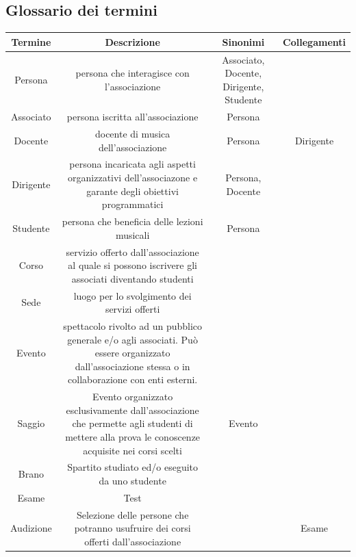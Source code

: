 \documentclass[12pt]{article}
\begin{document}
	\subsection{Glossario dei termini}
		\begin{tabular}{c|c|c|c}
			\hline
			Termine & Descrizione & Sinonimi & Collegamenti\\
			\hline
			Persona & persona che interagisce con l'associazione & Associato, Docente, Dirigente, Studente &\\
			\hline
			Associato & persona iscritta all'associazione & Persona & \\
			\hline
			Docente & docente di musica dell'associazione  & Persona & Dirigente\\
			\hline
			Dirigente & persona incaricata agli aspetti organizzativi dell'associazone e garante degli obiettivi programmatici & Persona, Docente & \\
			\hline
			Studente & persona che beneficia delle lezioni musicali & Persona & \\
			\hline
			Corso & servizio offerto dall'associazione al quale si possono iscrivere gli associati diventando studenti & &\\
			\hline
			Sede & luogo per lo svolgimento dei servizi offerti & &\\
			\hline
			Evento & spettacolo rivolto ad un pubblico generale e/o agli associati. Può essere organizzato dall'associazione stessa o in collaborazione con enti esterni. & &\\
			\hline
			Saggio & Evento organizzato esclusivamente dall'associazione che permette agli studenti di mettere alla prova le conoscenze acquisite nei corsi scelti & Evento &\\
			\hline
			Brano & Spartito studiato ed/o eseguito da uno studente & &\\
			\hline
			Esame & Test  & &\\
			\hline
			Audizione & Selezione delle persone che potranno usufruire dei corsi offerti dall'associazione & & Esame\\
			\hline
			\end{tabular}
\end{document}
